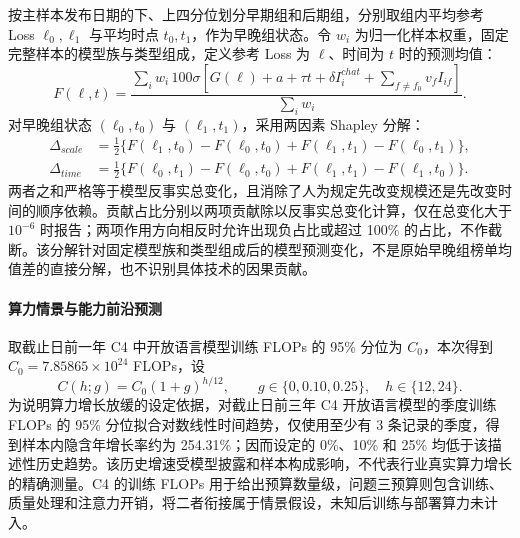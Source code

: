 \documentclass[bwprint]{gmcmthesis}
\numberwithin{equation}{section}
\numberwithin{figure}{section}
\numberwithin{table}{section}
\begin{document}
        按主样本发布日期的下、上四分位划分早期组和后期组，分别取组内平均参考 Loss $\ell_0,\ell_1$ 与平均时点 $t_0,t_1$，作为早晚组状态。令 $w_i$ 为归一化样本权重，固定完整样本的模型族与类型组成，定义参考 Loss 为 $\ell$、时间为 $t$ 时的预测均值：
        \begin{equation}
        F(\ell,t)=\frac{\sum_i w_i\,100\sigma\!\left[G(\ell)+a+\tau t+\delta I_i^{chat}+\sum_{f\ne f_0}v_fI_{if}\right]}{\sum_i w_i}.
        \label{eq:p4_counterfactual_mean}
        \end{equation}
        对早晚组状态 $(\ell_0,t_0)$ 与 $(\ell_1,t_1)$，采用两因素 Shapley 分解：
        \begin{equation}
        \begin{aligned}
        \Delta_{scale}&=\tfrac12\{F(\ell_1,t_0)-F(\ell_0,t_0)+F(\ell_1,t_1)-F(\ell_0,t_1)\},\\
        \Delta_{time}&=\tfrac12\{F(\ell_0,t_1)-F(\ell_0,t_0)+F(\ell_1,t_1)-F(\ell_1,t_0)\}.
        \end{aligned}
        \label{eq:p4_shapley}
        \end{equation}
        两者之和严格等于模型反事实总变化，且消除了人为规定先改变规模还是先改变时间的顺序依赖。贡献占比分别以两项贡献除以反事实总变化计算，仅在总变化大于 $10^{-6}$ 时报告；两项作用方向相反时允许出现负占比或超过 100\% 的占比，不作截断。该分解针对固定模型族和类型组成后的模型预测变化，不是原始早晚组榜单均值差的直接分解，也不识别具体技术的因果贡献。

        \paragraph{算力情景与能力前沿预测}
        取截止日前一年 C4 中开放语言模型训练 FLOPs 的 95\% 分位为 $C_0$，本次得到 $C_0=7.85865\times10^{24}$ FLOPs，设
        \begin{equation}
        C(h;g)=C_0(1+g)^{h/12},\qquad g\in\{0,0.10,0.25\},\quad h\in\{12,24\}.
        \label{eq:p4_compute_path}
        \end{equation}
        为说明算力增长放缓的设定依据，对截止日前三年 C4 开放语言模型的季度训练 FLOPs 的 95\% 分位拟合对数线性时间趋势，仅使用至少有 3 条记录的季度，得到样本内隐含年增长率约为 254.31\%；因而设定的 0\%、10\% 和 25\% 均低于该描述性历史趋势。该历史增速受模型披露和样本构成影响，不代表行业真实算力增长的精确测量。C4 的训练 FLOPs 用于给出预算数量级，问题三预算则包含训练、质量处理和注意力开销，将二者衔接属于情景假设，未知后训练与部署算力未计入。
\end{document}
